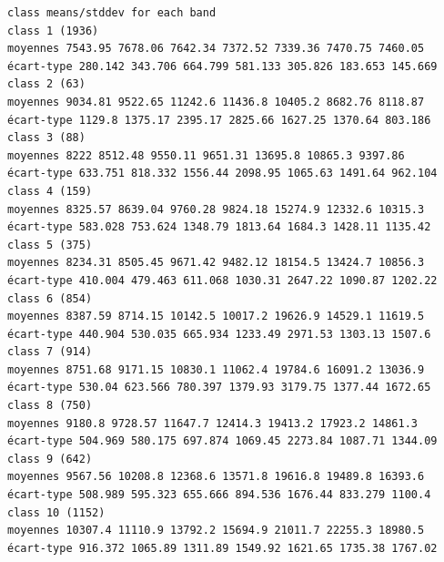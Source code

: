 \documentclass[environments,article,submit,pdftex,moreauthors]{Definitions/mdpi}
\begin{document}
\begin{scriptsize}
\begin{verbatim}
class means/stddev for each band
class 1 (1936)
moyennes 7543.95 7678.06 7642.34 7372.52 7339.36 7470.75 7460.05
écart-type 280.142 343.706 664.799 581.133 305.826 183.653 145.669
class 2 (63)
moyennes 9034.81 9522.65 11242.6 11436.8 10405.2 8682.76 8118.87
écart-type 1129.8 1375.17 2395.17 2825.66 1627.25 1370.64 803.186
class 3 (88)
moyennes 8222 8512.48 9550.11 9651.31 13695.8 10865.3 9397.86
écart-type 633.751 818.332 1556.44 2098.95 1065.63 1491.64 962.104
class 4 (159)
moyennes 8325.57 8639.04 9760.28 9824.18 15274.9 12332.6 10315.3
écart-type 583.028 753.624 1348.79 1813.64 1684.3 1428.11 1135.42
class 5 (375)
moyennes 8234.31 8505.45 9671.42 9482.12 18154.5 13424.7 10856.3
écart-type 410.004 479.463 611.068 1030.31 2647.22 1090.87 1202.22
class 6 (854)
moyennes 8387.59 8714.15 10142.5 10017.2 19626.9 14529.1 11619.5
écart-type 440.904 530.035 665.934 1233.49 2971.53 1303.13 1507.6
class 7 (914)
moyennes 8751.68 9171.15 10830.1 11062.4 19784.6 16091.2 13036.9
écart-type 530.04 623.566 780.397 1379.93 3179.75 1377.44 1672.65
class 8 (750)
moyennes 9180.8 9728.57 11647.7 12414.3 19413.2 17923.2 14861.3
écart-type 504.969 580.175 697.874 1069.45 2273.84 1087.71 1344.09
class 9 (642)
moyennes 9567.56 10208.8 12368.6 13571.8 19616.8 19489.8 16393.6
écart-type 508.989 595.323 655.666 894.536 1676.44 833.279 1100.4
class 10 (1152)
moyennes 10307.4 11110.9 13792.2 15694.9 21011.7 22255.3 18980.5
écart-type 916.372 1065.89 1311.89 1549.92 1621.65 1735.38 1767.02


\end{verbatim}
\end{scriptsize}
\end{document}
